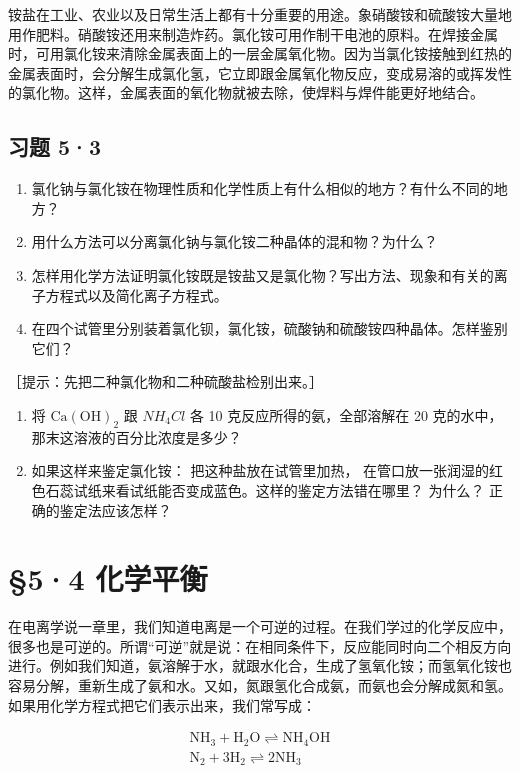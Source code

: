 铵盐在工业、农业以及日常生活上都有十分重要的用途。象硝酸铵和硫酸铵大量地用作肥料。硝酸铵还用来制造炸药。氯化铵可用作制干电池的原料。在焊接金属时，可用氯化铵来清除金属表面上的一层金属氧化物。因为当氯化铵接触到红热的金属表面时，会分解生成氯化氢，它立即跟金属氧化物反应，变成易溶的或挥发性的氯化物。这样，金属表面的氧化物就被去除，使焊料与焊件能更好地结合。

\subsection{习题 5·3}

\begin{enumerate}
\item
  氯化钠与氯化铵在物理性质和化学性质上有什么相似的地方？有什么不同的地方？
\item
  用什么方法可以分离氯化钠与氯化铵二种晶体的混和物？为什么？
\item
  怎样用化学方法证明氯化铵既是铵盐又是氯化物？写出方法、现象和有关的离子方程式以及简化离子方程式。
\item
  在四个试管里分别装着氯化钡，氯化铵，硫酸钠和硫酸铵四种晶体。怎样鉴别它们？
\end{enumerate}

［提示：先把二种氯化物和二种硫酸盐检别出来。］

\begin{enumerate}[start=5]
\item
  将 \(\mathrm{Ca(OH)}_{2}\) 跟 \(NH_{4}Cl\) 各 10
  克反应所得的氨，全部溶解在 20 克的水中，那末这溶液的百分比浓度是多少？
\item
  如果这样来鉴定氯化铵： 把这种盐放在试管里加热，
  在管口放一张润湿的红色石蕊试纸来看试纸能否变成蓝色。这样的鉴定方法错在哪里？
  为什么？ 正确的鉴定法应该怎样？
\end{enumerate}

\section{§5·4 化学平衡}

在电离学说一章里，我们知道电离是一个可逆的过程。在我们学过的化学反应中，很多也是可逆的。所谓``可逆''就是说：在相同条件下，反应能同时向二个相反方向进行。例如我们知道，氨溶解于水，就跟水化合，生成了氢氧化铵；而氢氧化铵也容易分解，重新生成了氨和水。又如，氮跟氢化合成氨，而氨也会分解成氮和氢。如果用化学方程式把它们表示出来，我们常写成：

\[
\begin{array}{l} \mathrm{NH} _ {3} + \mathrm{H} _ {2} \mathrm{O} \rightleftharpoons \mathrm{NH} _ {4} \mathrm{OH} \\ \mathrm{N} _ {2} + 3 \mathrm{H} _ {2} \rightleftharpoons 2 \mathrm{NH} _ {3} \\ \end{array}
\]

